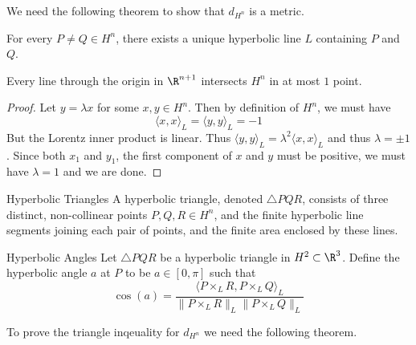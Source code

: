 We need the following theorem to show that $d_{H^n}$ is a metric. 

\begin{lmm}{}{} For every $P\neq Q\in H^n$, there exists a unique hyperbolic line $L$ containing $P$ and $Q$. 
\end{lmm}

\begin{lmm}{}{} Every line through the origin in $\R^{n+1}$ intersects $H^n$ in at most $1$ point. \tcbline
\begin{proof}
Let $y=\lambda x$ for some $x,y\in H^n$. Then by definition of $H^n$, we must have $$\langle x,x\rangle_L=\langle y,y\rangle_L=-1$$ But the Lorentz inner product is linear. Thus $\langle y,y\rangle_L=\lambda^2\langle x,x\rangle_L$ and thus $\lambda=\pm1$. Since both $x_1$ and $y_1$, the first component of $x$ and $y$ must be positive, we must have $\lambda=1$ and we are done. 
\end{proof}
\end{lmm}

\begin{defn}{Hyperbolic Triangles}{} A hyperbolic triangle, denoted $\triangle PQR$, consists of three distinct, non-collinear points $P,Q,R\in H^n$, and the finite hyperbolic line segments joining each pair of points, and the finite area enclosed by these lines. 
\end{defn}

\begin{defn}{Hyperbolic Angles}{} Let $\triangle PQR$ be a hyperbolic triangle in $H^2\subset\R^3$. Define the hyperbolic angle $a$ at $P$ to be $a\in[0,\pi]$ such that $$\cos(a)=\frac{\langle P\times_LR,P\times_LQ\rangle_L}{\|P\times_LR\|_L\|P\times_LQ\|_L}$$
\end{defn}

To prove the triangle inqeuality for $d_{H^n}$ we need the following theorem. 

